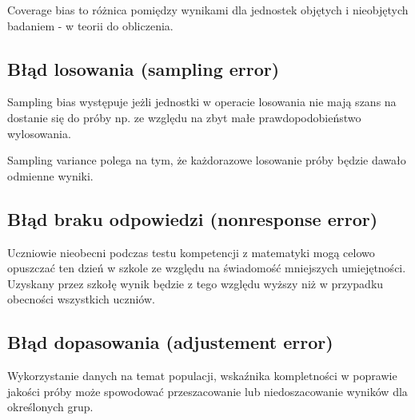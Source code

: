 \documentclass[
]{book}
\begin{document}
Coverage bias to różnica pomiędzy wynikami dla jednostek objętych i nieobjętych badaniem - w teorii do obliczenia.

\hypertarget{bux142ux105d-losowania-sampling-error}{%
\subsection{Błąd losowania (sampling error)}\label{bux142ux105d-losowania-sampling-error}}

Sampling bias występuje jeżli jednostki w operacie losowania nie mają szans na dostanie się do próby np. ze względu na zbyt małe prawdopodobieństwo wylosowania.

Sampling variance polega na tym, że każdorazowe losowanie próby będzie dawało odmienne wyniki.

\hypertarget{bux142ux105d-braku-odpowiedzi-nonresponse-error}{%
\subsection{Błąd braku odpowiedzi (nonresponse error)}\label{bux142ux105d-braku-odpowiedzi-nonresponse-error}}

Uczniowie nieobecni podczas testu kompetencji z matematyki mogą celowo opuszczać ten dzień w szkole ze względu na świadomość mniejszych umiejętności. Uzyskany przez szkołę wynik będzie z tego względu wyższy niż w przypadku obecności wszystkich uczniów.

\hypertarget{bux142ux105d-dopasowania-adjustement-error}{%
\subsection{Błąd dopasowania (adjustement error)}\label{bux142ux105d-dopasowania-adjustement-error}}

Wykorzystanie danych na temat populacji, wskaźnika kompletności w poprawie jakości próby może spowodować przeszacowanie lub niedoszacowanie wyników dla określonych grup.

  
\end{document}
